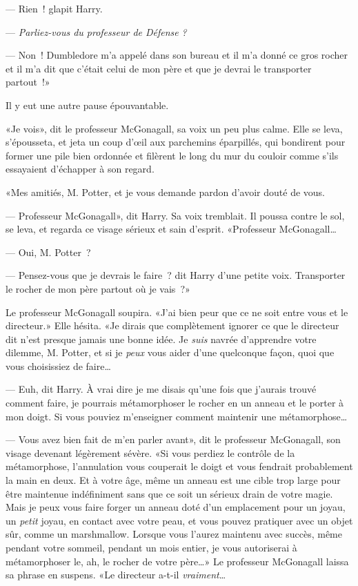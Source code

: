 --- Rien~! glapit Harry.

--- \emph{Parliez-vous du professeur de Défense} \emph{?}

--- Non~! Dumbledore m'a appelé dans son bureau et il m'a donné ce gros rocher et il m'a dit que c'était celui de mon père et que je devrai le transporter partout~!»

Il y eut une autre pause épouvantable.

«Je vois», dit le professeur McGonagall, sa voix un peu plus calme. Elle se leva, s'épousseta, et jeta un coup d'œil aux parchemins éparpillés, qui bondirent pour former une pile bien ordonnée et filèrent le long du mur du couloir comme s'ils essayaient d'échapper à son regard.

«Mes amitiés, M. Potter, et je vous demande pardon d'avoir douté de vous.

--- Professeur McGonagall», dit Harry. Sa voix tremblait. Il poussa contre le sol, se leva, et regarda ce visage sérieux et sain d'esprit. «Professeur McGonagall…

--- Oui, M. Potter~?

--- Pensez-vous que je devrais le faire~? dit Harry d'une petite voix. Transporter le rocher de mon père partout où je vais~?»

Le professeur McGonagall soupira. «J'ai bien peur que ce ne soit entre vous et le directeur.» Elle hésita. «Je dirais que complètement ignorer ce que le directeur dit n'est presque jamais une bonne idée. Je \emph{suis} navrée d'apprendre votre dilemme, M. Potter, et si je \emph{peux} vous aider d'une quelconque façon, quoi que vous choisissiez de faire…

--- Euh, dit Harry. À vrai dire je me disais qu'une fois que j'aurais trouvé comment faire, je pourrais métamorphoser le rocher en un anneau et le porter à mon doigt. Si vous pouviez m'enseigner comment maintenir une métamorphose…

--- Vous avez bien fait de m'en parler avant», dit le professeur McGonagall, son visage devenant légèrement sévère. «Si vous perdiez le contrôle de la métamorphose, l'annulation vous couperait le doigt et vous fendrait probablement la main en deux. Et à votre âge, même un anneau est une cible trop large pour être maintenue indéfiniment sans que ce soit un sérieux drain de votre magie. Mais je peux vous faire forger un anneau doté d'un emplacement pour un joyau, un \emph{petit} joyau, en contact avec votre peau, et vous pouvez pratiquer avec un objet sûr, comme un marshmallow. Lorsque vous l'aurez maintenu avec succès, même pendant votre sommeil, pendant un mois entier, je vous autoriserai à métamorphoser le, ah, le rocher de votre père…» Le professeur McGonagall laissa sa phrase en suspens. «Le directeur a-t-il \emph{vraiment}…

